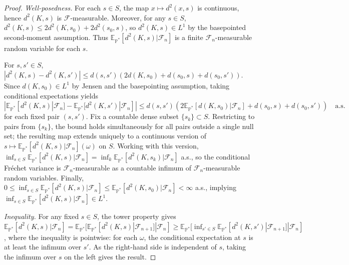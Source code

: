 \documentclass[10pt,a4paper]{amsart}
\begin{document}
\begin{proof}
\textit{Well-posedness.} For each $s \in S$, the map $x \mapsto d^2(x,s)$ is continuous, hence $d^2(K,s)$ is $\mathcal{F}$-measurable. Moreover, for any $s \in S$, $d^2(K,s) \leq 2d^2(K,s_0) + 2d^2(s_0,s)$, so $d^2(K,s) \in L^1$ by the basepointed second-moment assumption. Thus $\mathbb{E}_{\mathbb{P}^*}[d^2(K,s)|\mathcal{F}_n]$ is a finite $\mathcal{F}_n$-measurable random variable for each $s$.

For $s, s' \in S$, $|d^2(K,s) - d^2(K,s')| \leq d(s,s')(2d(K,s_0) + d(s_0,s) + d(s_0,s'))$. Since $d(K,s_0) \in L^1$ by Jensen and the basepointing assumption, taking conditional expectations yields $|\mathbb{E}_{\mathbb{P}^*}[d^2(K,s)|\mathcal{F}_n] - \mathbb{E}_{\mathbb{P}^*}[d^2(K,s')|\mathcal{F}_n]| \leq d(s,s')(2\mathbb{E}_{\mathbb{P}^*}[d(K,s_0)|\mathcal{F}_n] + d(s_0,s) + d(s_0,s')) \quad \text{a.s.}$ for each fixed pair $(s,s')$. Fix a countable dense subset $\{s_k\} \subset S$. Restricting to pairs from $\{s_k\}$, the bound holds simultaneously for all pairs outside a single null set; the resulting map extends uniquely to a continuous version of $s \mapsto \mathbb{E}_{\mathbb{P}^*}[d^2(K,s)|\mathcal{F}_n](\omega)$ on $S$. Working with this version, $\inf_{s \in S} \mathbb{E}_{\mathbb{P}^*}[d^2(K,s)|\mathcal{F}_n] = \inf_k \mathbb{E}_{\mathbb{P}^*}[d^2(K,s_k)|\mathcal{F}_n]$ a.s., so the conditional Fr\'{e}chet variance is $\mathcal{F}_n$-measurable as a countable infimum of $\mathcal{F}_n$-measurable random variables. Finally, $0 \leq \inf_{s \in S} \mathbb{E}_{\mathbb{P}^*}[d^2(K,s)|\mathcal{F}_n] \leq \mathbb{E}_{\mathbb{P}^*}[d^2(K,s_0)|\mathcal{F}_n] < \infty$ a.s., implying $\inf_{s \in S} \mathbb{E}_{\mathbb{P}^*}[d^2(K,s)|\mathcal{F}_n] \in L^1$.

\textit{Inequality.} For any fixed $s \in S$, the tower property gives $\mathbb{E}_{\mathbb{P}^*}[d^2(K,s)|\mathcal{F}_n] = \mathbb{E}_{\mathbb{P}^*}[\mathbb{E}_{\mathbb{P}^*}[d^2(K,s)|\mathcal{F}_{n+1}]|\mathcal{F}_n] \geq \mathbb{E}_{\mathbb{P}^*}[\inf_{s' \in S}\mathbb{E}_{\mathbb{P}^*}[d^2(K,s')|\mathcal{F}_{n+1}]|\mathcal{F}_n]$, where the inequality is pointwise: for each $\omega$, the conditional expectation at $s$ is at least the infimum over $s'$. As the right-hand side is independent of $s$, taking the infimum over $s$ on the left gives the result.
\end{proof}
\end{document}
